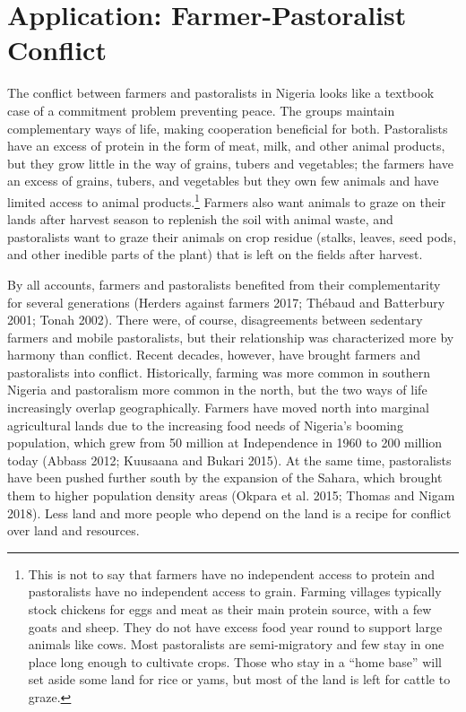 \documentclass[11pt]{article}
\begin{document}
\hypertarget{application-farmer-pastoralist-conflict}{%
\section{Application: Farmer-Pastoralist
Conflict}\label{application-farmer-pastoralist-conflict}}

The conflict between farmers and pastoralists in Nigeria looks like a
textbook case of a commitment problem preventing peace. The groups
maintain complementary ways of life, making cooperation beneficial for
both. Pastoralists have an excess of protein in the form of meat, milk,
and other animal products, but they grow little in the way of grains,
tubers and vegetables; the farmers have an excess of grains, tubers, and
vegetables but they own few animals and have limited access to animal
products.\footnote{This is not to say that farmers have no independent
  access to protein and pastoralists have no independent access to
  grain. Farming villages typically stock chickens for eggs and meat as
  their main protein source, with a few goats and sheep. They do not
  have excess food year round to support large animals like cows. Most
  pastoralists are semi-migratory and few stay in one place long enough
  to cultivate crops. Those who stay in a ``home base'' will set aside
  some land for rice or yams, but most of the land is left for cattle to
  graze.} Farmers also want animals to graze on their lands after
harvest season to replenish the soil with animal waste, and pastoralists
want to graze their animals on crop residue (stalks, leaves, seed pods,
and other inedible parts of the plant) that is left on the fields after
harvest.

By all accounts, farmers and pastoralists benefited from their
complementarity for several generations (Herders against farmers 2017;
Thébaud and Batterbury 2001; Tonah 2002). There were, of course,
disagreements between sedentary farmers and mobile pastoralists, but
their relationship was characterized more by harmony than conflict.
Recent decades, however, have brought farmers and pastoralists into
conflict. Historically, farming was more common in southern Nigeria and
pastoralism more common in the north, but the two ways of life
increasingly overlap geographically. Farmers have moved north into
marginal agricultural lands due to the increasing food needs of
Nigeria's booming population, which grew from 50 million at Independence
in 1960 to 200 million today (Abbass 2012; Kuusaana and Bukari 2015). At
the same time, pastoralists have been pushed further south by the
expansion of the Sahara, which brought them to higher population density
areas (Okpara et al. 2015; Thomas and Nigam 2018). Less land and more
people who depend on the land is a recipe for conflict over land and
resources.
\end{document}
